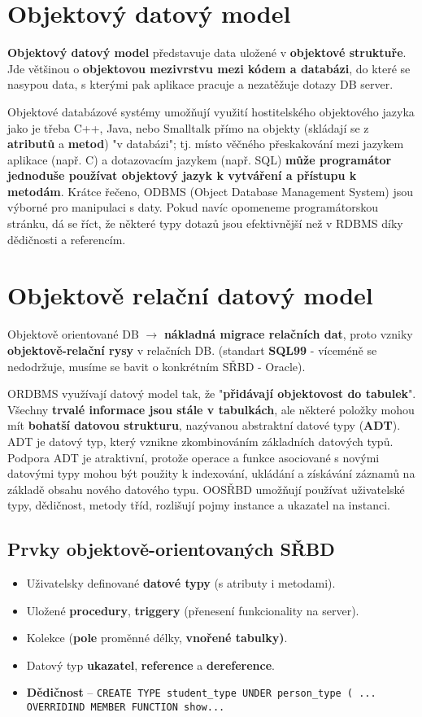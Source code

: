 \section{Objektový datový model}
\textbf{Objektový datový model} představuje data uložené v \textbf{objektové struktuře}. Jde většinou o \textbf{objektovou mezivrstvu mezi kódem a databázi}, do které se nasypou data, s kterými pak aplikace pracuje a nezatěžuje dotazy DB server.

Objektové databázové systémy umožňují využití hostitelského objektového jazyka jako je třeba C++, Java, nebo Smalltalk přímo na objekty (skládají se z \textbf{atributů} a \textbf{metod}) "v databázi"; tj. místo věčného přeskakování mezi jazykem aplikace (např. C) a dotazovacím jazykem (např. SQL) \textbf{může programátor jednoduše používat objektový jazyk k vytváření a přístupu k metodám}. Krátce řečeno, ODBMS (Object Database Management System) jsou výborné pro manipulaci s daty. Pokud navíc opomeneme programátorskou stránku, dá se říct, že některé typy dotazů jsou efektivnější než v RDBMS díky dědičnosti a referencím.

\section{Objektově relační datový model}
Objektově orientované DB $\rightarrow$ \textbf{nákladná migrace relačních dat}, proto vzniky \textbf{objektově-relační rysy }v relačních DB. (standart \textbf{SQL99} - víceméně se nedodržuje, musíme se bavit o konkrétním SŘBD - Oracle).

ORDBMS využívají datový model tak, že "\textbf{přidávají objektovost do tabulek}". Všechny \textbf{trvalé informace jsou stále v tabulkách}, ale některé položky mohou mít \textbf{bohatší datovou strukturu}, nazývanou abstraktní datové typy (\textbf{ADT}). ADT je datový typ, který vznikne zkombinováním základních datových typů. Podpora ADT je atraktivní, protože operace a funkce asociované s novými datovými typy mohou být použity k indexování, ukládání a získávání záznamů na základě obsahu nového datového typu. OOSŘBD umožňují používat uživatelské typy, dědičnost, metody tříd, rozlišují pojmy instance a ukazatel na instanci.

\subsection{Prvky objektově-orientovaných SŘBD}
\begin{itemize}
  \item Uživatelsky definované \textbf{datové typy} (s atributy i metodami).
  \item Uložené \textbf{procedury}, \textbf{triggery} (přenesení funkcionality na server).
  \item Kolekce (\textbf{pole} proměnné délky, \textbf{vnořené tabulky)}.
  \item Datový typ \textbf{ukazatel}, \textbf{reference} a \textbf{dereference}.
  \item \textbf{Dědičnost} -- \texttt{CREATE TYPE student\_type UNDER person\_type ( ... OVERRIDIND MEMBER FUNCTION show...}
\end{itemize}

